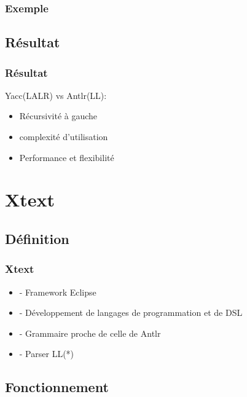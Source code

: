\documentclass{beamer}
\begin{document}
\subsubsection{Exemple}


\subsection{Résultat}

\begin{frame}\frametitle{Résultat}

	Yacc(LALR) vs Antlr(LL):
	\begin{itemize}
				\item Récursivité à gauche\newline
				\item complexité d'utilisation\newline
				\item Performance et flexibilité\newline
	\end{itemize}

\end{frame}

\section{Xtext}

\subsection{Définition}
	
	 
	
	 
	\begin{frame}
	\frametitle{Xtext}
 \begin{itemize}
			\item - Framework Eclipse
			\item - Développement de langages de programmation et de DSL
			\item - Grammaire proche de celle de Antlr
			\item - Parser LL(*) 
\end{itemize}
\end{frame} 



\subsection{Fonctionnement}
\end{document}
